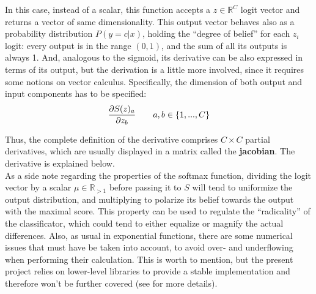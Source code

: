 In this case, instead of a scalar, this function accepts a \(z\in \mathbb{R}^C\) logit vector and returns a vector of same dimensionality. This output vector behaves also as a probability distribution \(P(y=c | x)\), holding the ``degree of belief'' for each \(z_i\) logit: every output is in the range \((0, 1)\), and the sum of all its outputs is always 1. And, analogous to the sigmoid, its derivative can be also expressed in terms of its output, but the derivation is a little more involved, since it requires some notions on vector calculus. Specifically, the dimension of both output and input components has to be specified:
\begin{equation*}
  \frac{\partial S(z)_a}{\partial z_b} \qquad a,b \in \{1, ..., C\}\\[3mm] %
\end{equation*}

Thus, the complete definition of the derivative comprises \(C\times C\) partial derivatives, which are usually displayed in a matrix called the \textbf{jacobian}\cite[p.86]{goodfellow}. The derivative is explained below.\\

As a side note regarding the properties of the softmax function, dividing the logit vector by a scalar \(\mu\in\mathbb{R}_{>1}\) before passing it to \(S\) will tend to uniformize the output distribution, and multiplying to polarize its belief towards the output with the maximal score. This property can be used to regulate the ``radicality'' of the classificator, which could tend to either equalize or magnify the actual differences. Also, as usual in exponential functions, there are some numerical issues that must have be taken into account, to avoid over- and underflowing when performing their calculation. This is worth to mention, but the present project relies on lower-level libraries to provide a stable implementation and therefore won't be further covered (see \cite[p.81 and p.185]{goodfellow} for more details).


